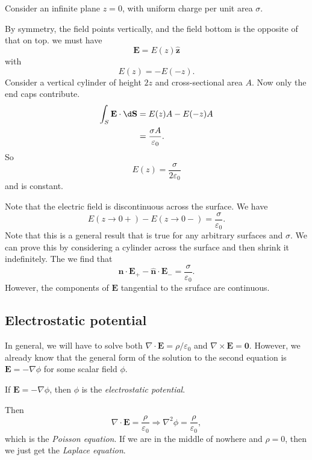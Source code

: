 \documentclass[a4paper]{article}
\begin{document}
\begin{eg}
  Consider an infinite plane $z = 0$, with uniform charge per unit area $\sigma$.

  \begin{center}
  \end{center}

  By symmetry, the field points vertically, and the field bottom is the opposite of that on top. we must have
  \[
    \mathbf{E} = E(z)\hat{\mathbf{z}}
  \]
  with
  \[
    E(z) = -E(-z).
  \]
  Consider a vertical cylinder of height $2z$ and cross-sectional area $A$. Now only the end caps contribute.
  \begin{align*}
    \int_S \mathbf{E} \cdot \d \mathbf{S} &= E(z) A - E(-z) A\\
    &=\frac{\sigma A}{\varepsilon _0}. 
  \end{align*}
  So
  \[
    E(z) = \frac{\sigma }{2\varepsilon_0}
  \]
  and is constant.

  Note that the electric field is discontinuous across the surface. We have
  \[
    E(z\to 0+) - E(z\to 0-) = \frac{\sigma}{\varepsilon_0}.
  \]
  Note that this is a general result that is true for any arbitrary surfaces and $\sigma$. We can prove this by considering a cylinder across the surface and then shrink it indefinitely. The we find that
  \[
    \hat{\mathbf{n}}\cdot \mathbf{E}_+ - \hat{\mathbf{n}}\cdot \mathbf{E}_- = \frac{\sigma}{\varepsilon_0}.
  \]
  However, the components of $\mathbf{E}$ tangential to the sruface are continuous. 
\end{eg}

\subsection{Electrostatic potential}
In general, we will have to solve both $\nabla \cdot \mathbf{E} = \rho/\varepsilon_0$ and $\nabla \times \mathbf{E} = \mathbf{0}$. However, we already know that the general form of the solution to the second equation is $\mathbf{E} = -\nabla\phi$ for some scalar field $\phi$.
\begin{defi}
  If $\mathbf{E} = -\nabla \phi$, then $\phi$ is the \emph{electrostatic potential}.
\end{defi}
Then
\[
  \nabla\cdot \mathbf{E} = \frac{\rho}{\varepsilon_0} \Rightarrow \nabla^2\phi = \frac{\rho}{\varepsilon_0},
\]
which is the \emph{Poisson equation}. If we are in the middle of nowhere and $\rho = 0$, then we just get the \emph{Laplace equation}.
\end{document}

